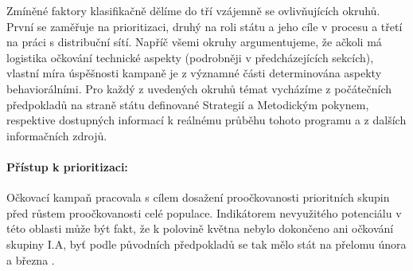 Zmíněné faktory klasifikačně dělíme do tří vzájemně se ovlivňujících okruhů. První se zaměřuje na prioritizaci, druhý na roli státu a jeho cíle v procesu a třetí na práci s distribuční sítí. %
%
Napříč všemi okruhy argumentujeme, že ačkoli má logistika očkování technické aspekty (podrobněji v předcházejících sekcích), vlastní míra úspěšnosti kampaně je z významné části determinována aspekty behaviorálními. Pro každý z uvedených okruhů témat vycházíme z počátečních předpokladů na straně státu definované Strategií a Metodickým pokynem, respektive dostupných informací k reálnému průběhu tohoto programu a z dalších informačních zdrojů.


\paragraph{Přístup k prioritizaci:} Očkovací kampaň pracovala s cílem dosažení proočkovanosti prioritních skupin před růstem proočkovanosti celé populace. Indikátorem nevyužitého potenciálu v této oblasti může být fakt, že k polovině května nebylo dokončeno ani očkování skupiny I.A, byť podle původních předpokladů se tak mělo stát na přelomu února a března \cite{ockovani_mp}.



